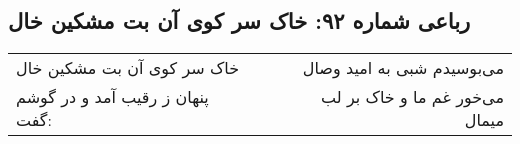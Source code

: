 \begin{center}
\section*{رباعی شماره ۹۲: خاک سر کوی آن بت مشکین خال}
\label{sec:092}
\begin{longtable}{l p{0.5cm} r}
خاک سر کوی آن بت مشکین خال
&&
می‌بوسیدم شبی به امید وصال
\\
پنهان ز رقیب آمد و در گوشم گفت:
&&
می‌خور غم ما و خاک بر لب میمال
\\
\end{longtable}
\end{center}
